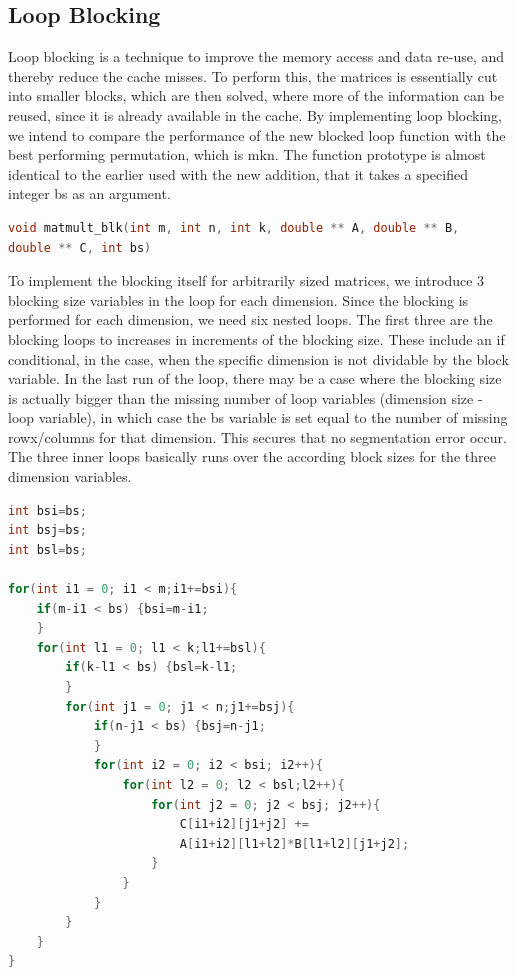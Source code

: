\subsection{Loop Blocking}

Loop blocking is a technique to improve the memory access and data re-use, and thereby reduce the cache misses. To perform this, the matrices is essentially cut into smaller blocks, which are then solved, where more of the information can be reused, since it is already available in the cache. By implementing loop blocking, we intend to compare the performance of the new blocked loop function with the best performing permutation, which is mkn. The function prototype is almost identical to the earlier used with the new addition, that it takes a specified integer bs as an argument.

\begin{lstlisting}[language=C++, caption=Blocked blk Prototype]
void matmult_blk(int m, int n, int k, double ** A, double ** B, 
double ** C, int bs)
\end{lstlisting}

To implement the blocking itself for arbitrarily sized matrices, we introduce 3 blocking size variables in the loop for each dimension. Since the blocking is performed for each dimension, we need six nested loops. The first three are the blocking loops to increases in increments of the blocking size. These include an if conditional, in the case, when the specific dimension is not dividable by the block variable. In the last run of the loop, there may be a case where the blocking size is actually bigger than the missing number of loop variables (dimension size - loop variable), in which case the bs variable is set equal to the number of missing rowx/columns for that dimension. This secures that no segmentation error occur.\\

The three inner loops basically runs over the according block sizes for the three dimension variables.

\begin{lstlisting}[language=C++, caption=Blocked Loop Function]
int bsi=bs;
int bsj=bs;
int bsl=bs;

for(int i1 = 0; i1 < m;i1+=bsi){
	if(m-i1 < bs) {bsi=m-i1;
	}
	for(int l1 = 0; l1 < k;l1+=bsl){
		if(k-l1 < bs) {bsl=k-l1;
		}
		for(int j1 = 0; j1 < n;j1+=bsj){
			if(n-j1 < bs) {bsj=n-j1;
			}
			for(int i2 = 0; i2 < bsi; i2++){	
				for(int l2 = 0; l2 < bsl;l2++){	
					for(int j2 = 0; j2 < bsj; j2++){	
						C[i1+i2][j1+j2] += 
						A[i1+i2][l1+l2]*B[l1+l2][j1+j2];
					}
				}
			}
		}
	}
}
\end{lstlisting}

